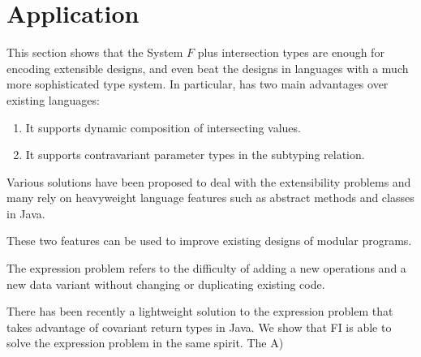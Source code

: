 \section{Application} \label{sec:application}


This section shows that the System $ F $ plus intersection types are enough for
encoding extensible designs, and even beat the designs in languages with a much
more sophisticated type system. In particular, \name has two main advantages
over existing languages:

\begin{enumerate}
\item It supports dynamic composition of intersecting values.
\item It supports contravariant parameter types in the subtyping relation.
\end{enumerate}

Various solutions have been proposed to deal with the extensibility problems and
many rely on heavyweight language features such as abstract methods and classes
in Java.


These two features can be used to improve existing designs of modular programs.


The expression problem refers to the difficulty of adding a new operations and a
new data variant without changing or duplicating existing code.

There has been recently a lightweight solution to the expression problem that
takes advantage of covariant return types in Java. We show that FI is able to
solve the expression problem in the same spirit. The
A)







